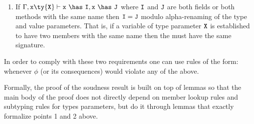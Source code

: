 {\begin{enumerate}
\item If $\Gamma,{\tt x}\ty{\tt X}\vdash{\tt x}~\has~{\tt I},{\tt x}~\has~{\tt J}$ where $\tt I$ and $\tt J$ are both fields or both methods with the same name then ${\tt I}={\tt J}$ modulo alpha-renaming of the type and value parameters. That is, if a variable of type parameter $\tt X$ is established to have two members with the same name then the must have the same signature.
\end{enumerate}
In order to comply with these two requirements one can use rules of the form:
\infrule {\Gamma\vdash \phi}{\Gamma\vdash\false} whenever $\phi$ (or its consequences) would violate any of the above.

Formally, the proof of the soudness result is built on top of lemmas so that the main body of the proof does not directly depend on member lookup rules and subtyping rules for types parameters, but do it through lemmas that exactly formalize points 1 and 2 above.

}









